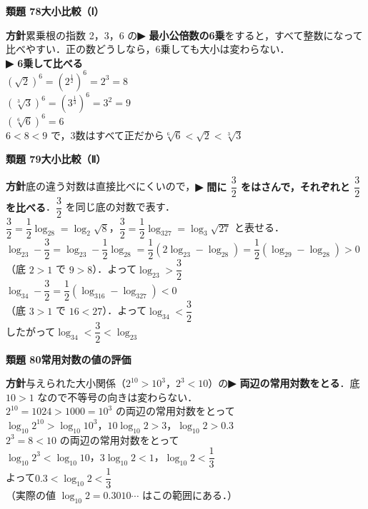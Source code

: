 \documentclass[a4paper,11pt]{ltjsarticle}
\newcommand{\ans}[2]{\Needspace{5\baselineskip}\vspace{6pt}%
  {\sffamily\bfseries 類題 #1\quad #2}\par}
\newcommand{\point}[1]{\textsf{\bfseries ▶ #1}}
\begin{document}
\ans{78}{大小比較（Ⅰ）}
\begin{kai}
\textbf{方針}\quad 累乗根の指数 2，3，6 の\point{最小公倍数の6乗}をすると，すべて整数になって比べやすい．正の数どうしなら，6乗しても大小は変わらない．\\[2pt]
\point{6乗して比べる}\\
\hspace*{1.5em}$(\sqrt2)^6=(2^{\frac12})^6=2^3=8$\\
\hspace*{1.5em}$(\sqrt[3]3)^6=(3^{\frac13})^6=3^2=9$\\
\hspace*{1.5em}$(\sqrt[6]6)^6=6$\\
$6<8<9$ で，3数はすべて正だから\quad $\sqrt[6]6<\sqrt2<\sqrt[3]3$
\end{kai}

\ans{79}{大小比較（Ⅱ）}
\begin{kai}
\textbf{方針}\quad 底の違う対数は直接比べにくいので，\point{間に $\dfrac32$ をはさんで，それぞれと $\dfrac32$ を比べる}．$\dfrac32$ を同じ底の対数で表す．\\[2pt]
$\dfrac32=\dfrac12\log_28=\log_2\sqrt8$，\quad $\dfrac32=\dfrac12\log_327=\log_3\sqrt{27}$ と表せる．\\[2pt]
$\log_23-\dfrac32=\log_23-\dfrac12\log_28=\dfrac12(2\log_23-\log_28)=\dfrac12(\log_29-\log_28)>0$\\
\hspace*{1.5em}（底 $2>1$ で $9>8$）．よって\quad $\log_23>\dfrac32$\\[2pt]
$\log_34-\dfrac32=\dfrac12(\log_316-\log_327)<0$\\
\hspace*{1.5em}（底 $3>1$ で $16<27$）．よって\quad $\log_34<\dfrac32$\\[2pt]
したがって\quad $\log_34<\dfrac32<\log_23$
\end{kai}

\ans{80}{常用対数の値の評価}
\begin{kai}
\textbf{方針}\quad 与えられた大小関係（$2^{10}>10^3$，$2^3<10$）の\point{両辺の常用対数をとる}．底 $10>1$ なので不等号の向きは変わらない．\\[2pt]
$2^{10}=1024>1000=10^3$ の両辺の常用対数をとって\\
\hspace*{1.5em}$\log_{10}2^{10}>\log_{10}10^3$，\quad $10\log_{10}2>3$，\quad $\log_{10}2>0.3$\\[2pt]
$2^3=8<10$ の両辺の常用対数をとって\\
\hspace*{1.5em}$\log_{10}2^3<\log_{10}10$，\quad $3\log_{10}2<1$，\quad $\log_{10}2<\dfrac13$\\[2pt]
よって\quad $0.3<\log_{10}2<\dfrac13$\\
（実際の値 $\log_{10}2=0.3010\cdots$ はこの範囲にある．）
\end{kai}
\end{document}

